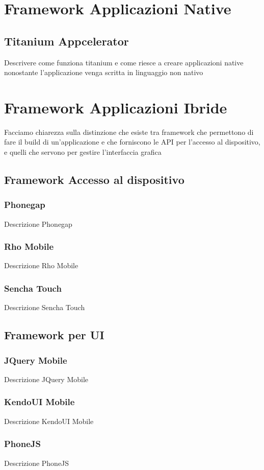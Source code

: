 	\section{Framework Applicazioni Native}
	\subsection{Titanium Appcelerator}
	Descrivere come funziona titanium e come riesce a creare applicazioni native nonostante 				l'applicazione venga scritta in linguaggio non nativo
	\section{Framework Applicazioni Ibride}
	Facciamo chiarezza sulla distinzione che esiste tra framework che permettono di fare il build 		di un'applicazione e che forniscono le API per l'accesso al dispositivo,  e quelli che servono 		per gestire l'interfaccia grafica
	\subsection{Framework Accesso al dispositivo}
	\subsubsection{Phonegap}
	Descrizione Phonegap
	\subsubsection{Rho Mobile}
	Descrizione Rho Mobile
	\subsubsection{Sencha Touch}
	Descrizione Sencha Touch
	\subsection{Framework per UI}
	\subsubsection{JQuery Mobile}
	Descrizione JQuery Mobile
	\subsubsection{KendoUI Mobile}
	Descrizione KendoUI Mobile
	\subsubsection{PhoneJS}
	Descrizione PhoneJS

